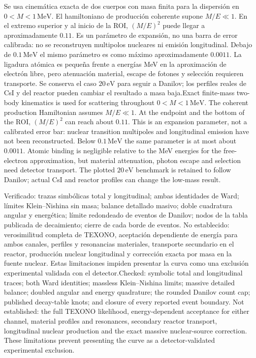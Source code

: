 \documentclass[11pt]{article}
\newcommand{\B}[2]{\ifspanish#2\else#1\fi}
\begin{document}
\B{Exact finite-mass two-body kinematics is used for scattering throughout $0<M<1\,\mathrm{MeV}$. The coherent production Hamiltonian assumes $M/E\ll1$. At the endpoint and the bottom of the ROI, $(M/E)^2$ can reach about $0.11$. This is an expansion parameter, not a calibrated error bar: nuclear transition multipoles and longitudinal emission have not been reconstructed. Below $0.1\,\mathrm{MeV}$ the same parameter is at most about $0.0011$. Atomic binding is negligible relative to the MeV energies for the free-electron approximation, but material attenuation, photon escape and selection need detector transport. The plotted $20\,\mathrm{eV}$ benchmark is retained to follow Danilov; actual CsI and reactor profiles can change the low-mass result.}
{Se usa cinemática exacta de dos cuerpos con masa finita para la dispersión en $0<M<1\,\mathrm{MeV}$. El hamiltoniano de producción coherente supone $M/E\ll1$. En el extremo superior y al inicio de la ROI, $(M/E)^2$ puede llegar a aproximadamente $0.11$. Es un parámetro de expansión, no una barra de error calibrada: no se reconstruyen multipolos nucleares ni emisión longitudinal. Debajo de $0.1\,\mathrm{MeV}$ el mismo parámetro es como máximo aproximadamente $0.0011$. La ligadura atómica es pequeña frente a energías MeV en la aproximación de electrón libre, pero atenuación material, escape de fotones y selección requieren transporte. Se conserva el caso $20\,\mathrm{eV}$ para seguir a Danilov; los perfiles reales de CsI y del reactor pueden cambiar el resultado a masa baja.}

\B{Checked: symbolic total and longitudinal traces; both Ward identities; massless Klein--Nishina limits; massive detailed balance; doubled angular and energy quadrature; the rounded Danilov count cap; published decay-table knots; and closure of every reported event boundary. Not established: the full TEXONO likelihood, energy-dependent acceptance for either channel, material profiles and resonances, secondary reactor transport, longitudinal nuclear production and the exact massive nuclear-source correction. These limitations prevent presenting the curve as a detector-validated experimental exclusion.}
{Verificado: trazas simbólicas total y longitudinal; ambas identidades de Ward; límites Klein--Nishina sin masa; balance detallado masivo; doble cuadratura angular y energética; límite redondeado de eventos de Danilov; nodos de la tabla publicada de decaimiento; cierre de cada borde de eventos. No establecido: verosimilitud completa de TEXONO, aceptación dependiente de energía para ambos canales, perfiles y resonancias materiales, transporte secundario en el reactor, producción nuclear longitudinal y corrección exacta por masa en la fuente nuclear. Estas limitaciones impiden presentar la curva como una exclusión experimental validada con el detector.}
\end{document}
